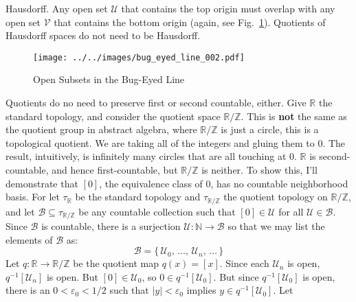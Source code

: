 \documentclass{article}
\theoremstyle{plain}
\theoremstyle{normal}
\begin{document}
        Hausdorff. Any open set $\mathcal{U}$ that contains the top origin must
        overlap with any open set $\mathcal{V}$ that contains the bottom
        origin (again, see Fig.~\ref{fig:bug_eyed_line_002}). Quotients of
        Hausdorff spaces do not need to be Hausdorff.
        \begin{figure}
            \centering
            \texttt{[image: ../../images/bug\_eyed\_line\_002.pdf]}
            \caption{Open Subsets in the Bug-Eyed Line}
            \label{fig:bug_eyed_line_002}
        \end{figure}
        \par\hfill\par
        Quotients do no need to preserve first or second countable, either.
        Give $\mathbb{R}$ the standard topology, and consider the quotient space
        $\mathbb{R}/\mathbb{Z}$. This is \textbf{not} the same as the quotient
        group in abstract algebra, where $\mathbb{R}/\mathbb{Z}$ is just a
        circle, this is a topological quotient. We are taking all of the
        integers and gluing them to $0$. The result, intuitively, is infinitely
        many circles that are all touching at $0$. $\mathbb{R}$ is
        second-countable, and hence first-countable, but $\mathbb{R}/\mathbb{Z}$
        is neither. To show this, I'll demonstrate that $[0]$, the equivalence
        class of $0$, has no countable neighborhood basis. For let
        $\tau_{\mathbb{R}}$ be the standard topology and
        $\tau_{\mathbb{R}/\mathbb{Z}}$ the quotient topology on
        $\mathbb{R}/\mathbb{Z}$, and let
        $\mathcal{B}\subseteq\tau_{\mathbb{R}/\mathbb{Z}}$ be any countable
        collection such that $[0]\in\mathcal{U}$ for all
        $\mathcal{U}\in\mathcal{B}$. Since $\mathcal{B}$ is countable, there
        is a surjection $\mathcal{U}:\mathbb{N}\rightarrow\mathcal{B}$ so
        that we may list the elements of $\mathcal{B}$ as:
        \begin{equation}
            \mathcal{B}=
            \{\,\mathcal{U}_{0},\,\dots,\,\mathcal{U}_{n},\,\dots\,\}
        \end{equation}
        Let $q:\mathbb{R}\rightarrow\mathbb{R}/\mathbb{Z}$ be the quotient
        map $q(x)=[x]$. Since each $\mathcal{U}_{n}$ is open,
        $q^{-1}[\mathcal{U}_{n}]$ is open. But $[0]\in\mathcal{U}_{0}$, so
        $0\in{q}^{-1}[\mathcal{U}_{0}]$. But since $q^{-1}[\mathcal{U}_{0}]$ is
        open, there is an $0<\varepsilon_{0}<1/2$ such that
        $|y|<\varepsilon_{0}$ implies $y\in{q}^{-1}[\mathcal{U}_{0}]$. Let
\end{document}
